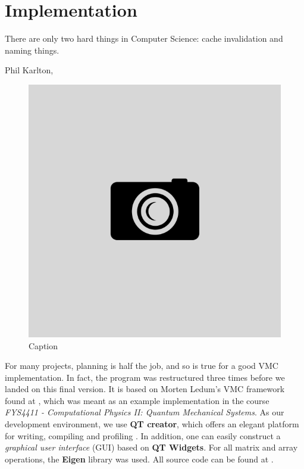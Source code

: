 \chapter{Implementation} \label{sec:implementation}
\epigraph{There are only two hard things in Computer Science: cache invalidation and naming things.}{Phil Karlton, \cite{fowler_bliki:_nodate}}
\begin{figure}[H]
	\centering
	\includegraphics[scale=0.4]{Images/example.png}
	\caption{Caption}
\end{figure}

For many projects, planning is half the job, and so is true for a good VMC implementation. In fact, the program was restructured three times before we landed on this final version. It is based on Morten Ledum's VMC framework found at \cite{ledum_simple_2016}, which was meant as an example implementation in the course \textit{FYS4411 - Computational Physics II: Quantum Mechanical Systems}. As our development environment, we use \textbf{QT creator}, which offers an elegant platform for writing, compiling and profiling \cite{noauthor_qt_2019}. In addition, one can easily construct a \textit{graphical user interface} (GUI) based on \textbf{QT Widgets}. For all matrix and array operations, the \textbf{Eigen} library was used. All source code can be found at \cite{nordhagen_general_2019}. \bigskip

